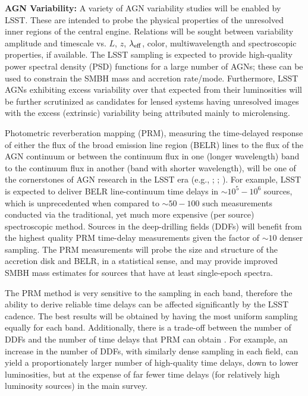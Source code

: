 {\bf AGN Variability:} A variety of AGN variability studies will be enabled by LSST. These are intended to probe the physical properties of the unresolved inner regions of the central engine. Relations will be sought between variability amplitude and timescale vs. $L$, $z$, $\lambda_{\rm eff}$, color, multiwavelength and spectroscopic properties, if available. The LSST sampling is expected to provide high-quality power spectral density (PSD) functions for a large number of AGNs; these can be used to constrain the SMBH mass and accretion rate/mode. Furthermore, LSST AGNs exhibiting excess variability over that expected from their luminosities will be further scrutinized as candidates for lensed systems having unresolved images with the excess (extrinsic) variability being attributed mainly to microlensing.

Photometric reverberation mapping (PRM), measuring the time-delayed response of either the flux of the broad emission line region (BELR) lines to the flux of the AGN continuum or between the continuum flux in one (longer wavelength) band to the continuum flux in another (band with shorter wavelength), will be one of the cornerstones of AGN research in the LSST era
(e.g., \citet{Chelouche2013}; \citet{CheloucheandZucker2013}; \citet{CheloucheEtal2014}). For example, LSST is expected to deliver BELR line-continuum time delays in $\sim10^5-10^6$ sources, which is unprecedented when compared to $\sim50-100$ such measurements conducted via the traditional, yet much more expensive (per source) spectroscopic method. Sources in the deep-drilling fields (DDFs) will benefit from the highest quality PRM time-delay measurements given the factor of $\sim10$ denser sampling. The PRM measurements will probe the size and structure of the accretion disk and BELR, in a statistical sense, and may provide improved SMBH mass estimates for sources that have at least single-epoch spectra.

The PRM method is very sensitive to the sampling in each band, therefore the ability to derive reliable time delays can be affected significantly by the LSST cadence. The best results will be obtained by having the most uniform sampling equally for each band. Additionally, there is a trade-off between the number of DDFs and the number of time delays that PRM can obtain \citep{CheloucheEtal2014}. For example, an increase in the number of DDFs, with similarly dense sampling in each field, can yield a proportionately larger number of high-quality time delays, down to lower luminosities, but at the expense of far fewer time delays (for relatively high luminosity sources) in the main survey.

